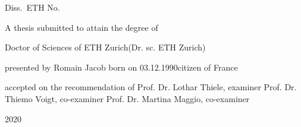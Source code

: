
\newcommand{\degreestring}{Doctor of Sciences of ETH Zurich}
\newcommand{\degreestringabr}{(Dr. sc. ETH Zurich)}
\newcommand{\authorstring}{Romain Jacob}
\newcommand{\acatitlestring}{M.Sc. École Normale Supérieure de Cachan}
\newcommand{\dateofbirthstring}{03.12.1990}
\newcommand{\citizenstringA}{France}
\newcommand{\examinerstring}{Prof. Dr. Lothar Thiele}
\newcommand{\coexaminerstringA}{Prof. Dr. Thiemo Voigt}
\newcommand{\coexaminerstringB}{Prof. Dr. Martina Maggio}
\newcommand{\datestring}{2020}

\begin{titlepage}
{
\sffamily\setlength{\baselineskip}{10mm}

\begin{centerline}
{\large\noindent Diss.\ ETH No.\ \dissnumstring}
\end{centerline}
\vfill

\begin{center}
\LARGE\bfseries
\titlestringNOBR
\end{center}
\vfill

\begin{center}
\large A thesis submitted to attain the degree of
\end{center}
\vspace{0.55\fill}

\begin{center}
\large \degreestring \linebreak \degreestringabr
\end{center}
\vspace{0.55\fill}

\begin{center}
\large presented by \linebreak \authorstring %
\linebreak \linebreak born on \dateofbirthstring \linebreak citizen of
\citizenstringA
\end{center}
\vspace{3\fill}

\begin{center}
\large accepted on the recommendation of \linebreak
\examinerstring, examiner \linebreak
\coexaminerstringA, co-examiner \linebreak
\coexaminerstringB, co-examiner
\end{center}
\vspace{0.55\fill}

\begin{center}
\large{\datestring}
\end{center}
}
\end{titlepage}
